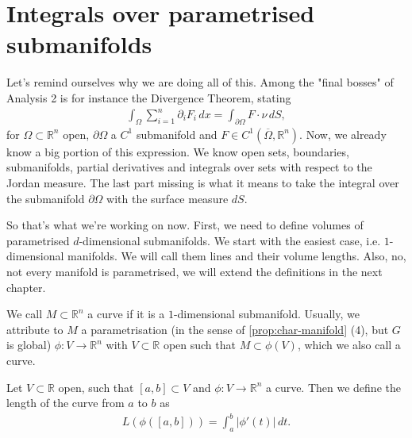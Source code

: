 \section{Integrals over parametrised submanifolds}

Let's remind ourselves why we are doing all of this. Among the "final bosses" of Analysis 2 is for instance the Divergence Theorem, stating
\begin{align*}
	\int_{\Omega} \sum_{i=1}^{n} \partial_{i}F_{i} \, dx = \int_{\partial \Omega} F \cdot \nu \, dS,
\end{align*}
for $\Omega \subset \mathbb{R}^{n}$ open, $\partial \Omega$ a $C^{1}$ submanifold and $F \in C^{1}(\overline{ \Omega }, \mathbb{R}^{n})$. Now, we already know a big portion of this expression. We know open sets, boundaries, submanifolds, partial derivatives and integrals over sets with respect to the Jordan measure. The last part missing is what it means to take the integral over the submanifold $\partial \Omega$ with the surface measure $dS$.

So that's what we're working on now. First, we need to define volumes of parametrised $d$-dimensional submanifolds. We start with the easiest case, i.e. $1$-dimensional manifolds. We will call them lines and their volume lengths. Also, no, not every manifold is parametrised, we will extend the definitions in the next chapter. 

\begin{definition}\label{def:curve-new}
	We call $M \subset \mathbb{R}^{n}$ a curve if it is a $1$-dimensional submanifold. Usually, we attribute to $M$ a parametrisation (in the sense of \ref{prop:char-manifold} (4), but $G$ is global) $\phi: V \to \mathbb{R}^{n}$ with $V \subset \mathbb{R}$ open such that $M \subset \phi(V)$, which we also call a curve.
\end{definition}

\begin{definition}\label{def:length}
	Let $V \subset \mathbb{R}$ open, such that $[a,b] \subset V$ and $\phi: V \to \mathbb{R}^{n}$ a curve. Then we define the length of the curve from $a$ to $b$ as
	\begin{align*}
		L(\phi([a,b])) = \int_{a}^{b} \left| \phi'(t) \right| \, dt.
	\end{align*}
\end{definition}

